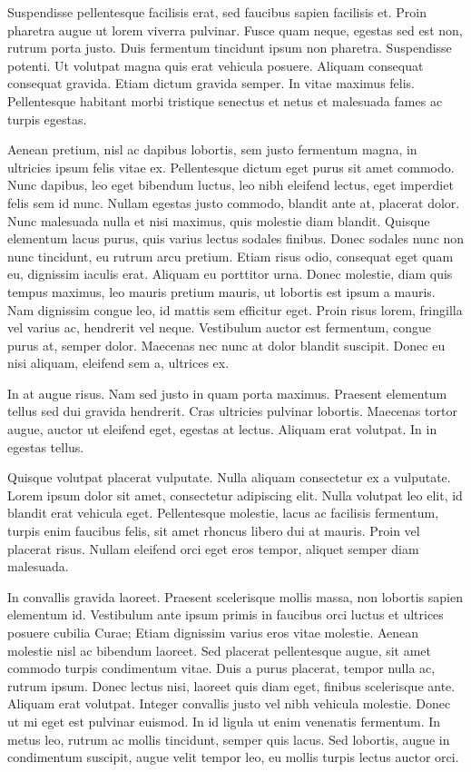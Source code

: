 Suspendisse pellentesque facilisis erat, sed faucibus sapien facilisis et. Proin pharetra augue ut lorem viverra pulvinar. Fusce quam neque, egestas sed est non, rutrum porta justo. Duis fermentum tincidunt ipsum non pharetra. Suspendisse potenti. Ut volutpat magna quis erat vehicula posuere. Aliquam consequat consequat gravida. Etiam dictum gravida semper. In vitae maximus felis. Pellentesque habitant morbi tristique senectus et netus et malesuada fames ac turpis egestas.

Aenean pretium, nisl ac dapibus lobortis, sem justo fermentum magna, in ultricies ipsum felis vitae ex. Pellentesque dictum eget purus sit amet commodo. Nunc dapibus, leo eget bibendum luctus, leo nibh eleifend lectus, eget imperdiet felis sem id nunc. Nullam egestas justo commodo, blandit ante at, placerat dolor. Nunc malesuada nulla et nisi maximus, quis molestie diam blandit. Quisque elementum lacus purus, quis varius lectus sodales finibus. Donec sodales nunc non nunc tincidunt, eu rutrum arcu pretium. Etiam risus odio, consequat eget quam eu, dignissim iaculis erat. Aliquam eu porttitor urna. Donec molestie, diam quis tempus maximus, leo mauris pretium mauris, ut lobortis est ipsum a mauris. Nam dignissim congue leo, id mattis sem efficitur eget. Proin risus lorem, fringilla vel varius ac, hendrerit vel neque. Vestibulum auctor est fermentum, congue purus at, semper dolor. Maecenas nec nunc at dolor blandit suscipit. Donec eu nisi aliquam, eleifend sem a, ultrices ex.

In at augue risus. Nam sed justo in quam porta maximus. Praesent elementum tellus sed dui gravida hendrerit. Cras ultricies pulvinar lobortis. Maecenas tortor augue, auctor ut eleifend eget, egestas at lectus. Aliquam erat volutpat. In in egestas tellus.

Quisque volutpat placerat vulputate. Nulla aliquam consectetur ex a vulputate. Lorem ipsum dolor sit amet, consectetur adipiscing elit. Nulla volutpat leo elit, id blandit erat vehicula eget. Pellentesque molestie, lacus ac facilisis fermentum, turpis enim faucibus felis, sit amet rhoncus libero dui at mauris. Proin vel placerat risus. Nullam eleifend orci eget eros tempor, aliquet semper diam malesuada.

In convallis gravida laoreet. Praesent scelerisque mollis massa, non lobortis sapien elementum id. Vestibulum ante ipsum primis in faucibus orci luctus et ultrices posuere cubilia Curae; Etiam dignissim varius eros vitae molestie. Aenean molestie nisl ac bibendum laoreet. Sed placerat pellentesque augue, sit amet commodo turpis condimentum vitae. Duis a purus placerat, tempor nulla ac, rutrum ipsum. Donec lectus nisi, laoreet quis diam eget, finibus scelerisque ante. Aliquam erat volutpat. Integer convallis justo vel nibh vehicula molestie. Donec ut mi eget est pulvinar euismod. In id ligula ut enim venenatis fermentum. In metus leo, rutrum ac mollis tincidunt, semper quis lacus. Sed lobortis, augue in condimentum suscipit, augue velit tempor leo, eu mollis turpis lectus auctor orci.

